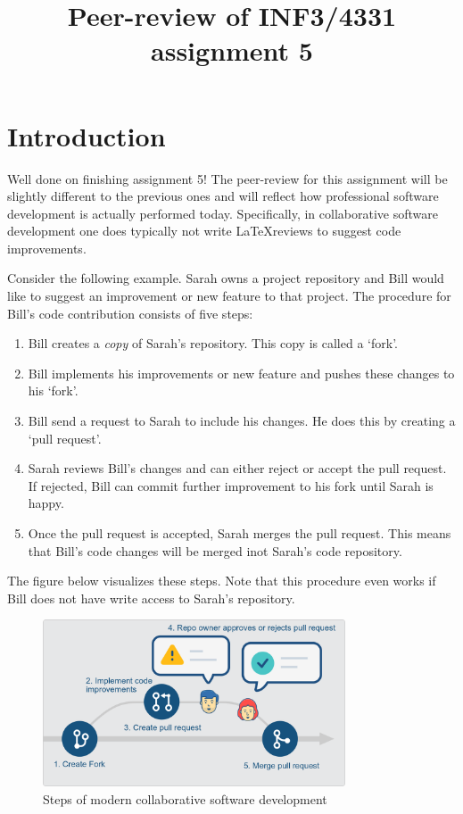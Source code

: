 \documentclass[a4paper]{article}
\title{Peer-review of INF3/4331 assignment 5}
\begin{document}
\maketitle

\section{Introduction}

Well done on finishing assignment 5!
The peer-review for this assignment will be slightly different to the previous ones and  will reflect how professional software development is actually performed today. Specifically, in collaborative software development one does typically not write \LaTeX reviews to suggest code improvements.  

Consider the following example. Sarah owns a project repository and Bill would like to suggest an improvement or new feature to that project. The procedure for Bill's code contribution consists of five steps:
\begin{enumerate}
\item Bill creates a \emph{copy} of Sarah's repository. This copy is called a `fork'.
\item Bill implements his improvements or new feature and pushes these changes to his `fork'.
\item Bill send a request to Sarah to include his changes. He does this by creating a `pull request'.
\item Sarah reviews Bill's changes and can either reject or accept the pull request. If rejected, Bill can commit further improvement to his fork until Sarah is happy.
\item Once the pull request is accepted, Sarah merges the pull request. This means that Bill's code changes will be merged inot Sarah's code repository.
\end{enumerate}

The figure below visualizes these steps. Note that this procedure even works if Bill does not have write access to Sarah's repository.

\begin{figure}[h!]
\centering
\includegraphics[width=0.8\textwidth]{collaboration.png}
\caption{Steps of modern collaborative software development}\label{fig:steps}
\end{figure}
\end{document}
